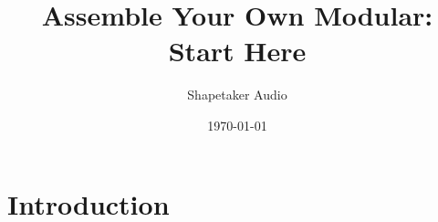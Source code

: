 \documentclass{article}
\title{Assemble Your Own Modular: Start Here}
\author{Shapetaker Audio}
\date{\today}
\begin{document}
	
\begin{titlingpage}
	\maketitle
\end{titlingpage}

\newpage

\begin{versionhistory}
\end{versionhistory}
\vspace{1cm}
\tableofcontents

\newpage
	
\section{Introduction}
\end{document}
